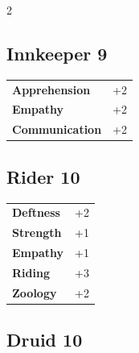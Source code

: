 \begin{multicols}{2}
\begin{tcolorbox}
\end{tcolorbox}

\begin{tcolorbox}
    \subsection*{Innkeeper \hfill \small{9 }}
    \tcblower




\begin{tabular}{@{}ll@{}}
    \textbf{Apprehension} & +2\\
    \textbf{Empathy} & +2\\
    \textbf{Communication} & +2\\
\end{tabular}


\end{tcolorbox}

\begin{tcolorbox}
    \subsection*{Rider \hfill \small{10 }}
    \tcblower




\begin{tabular}{@{}ll@{}}
    \textbf{Deftness} & +2\\
    \textbf{Strength} & +1\\
    \textbf{Empathy} & +1\\
    \textbf{Riding} & +3\\
    \textbf{Zoology} & +2\\
\end{tabular}


\end{tcolorbox}

\begin{tcolorbox}
    \subsection*{Druid \hfill \small{10 }}
    \tcblower



\end{tcolorbox}
\end{multicols}
